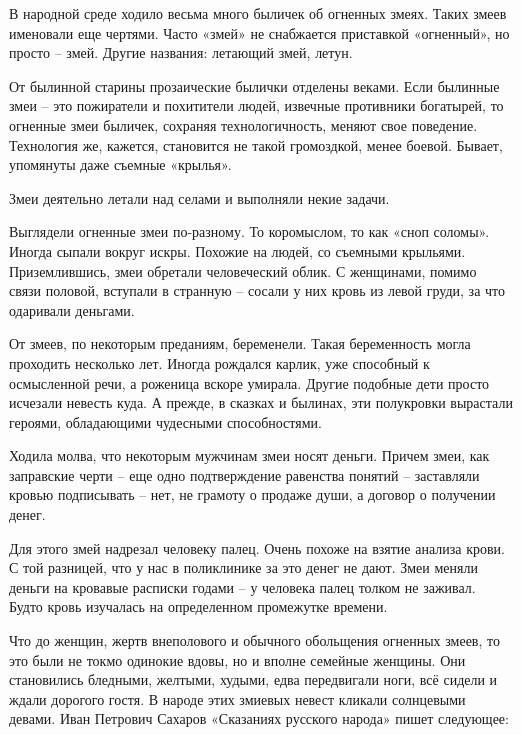 В народной среде ходило весьма много быличек об огненных змеях. Таких змеев именовали еще чертями. Часто «змей» не снабжается приставкой «огненный», но просто – змей. Другие названия: летающий змей, летун. 

От былинной старины прозаические былички отделены веками. Если былинные змеи – это пожиратели и похитители людей, извечные противники богатырей, то огненные змеи быличек, сохраняя технологичность, меняют свое поведение. Технология же, кажется, становится не такой громоздкой, менее боевой. Бывает, упомянуты даже съемные «крылья».

Змеи деятельно летали над селами и выполняли некие задачи.

Выглядели огненные змеи по-разному. То коромыслом, то как «сноп соломы». Иногда сыпали вокруг искры. Похожие на людей, со съемными крыльями. Приземлившись, змеи обретали человеческий облик. С женщинами, помимо связи половой, вступали в странную – сосали у них кровь из левой груди, за что одаривали деньгами. 

От змеев, по некоторым преданиям, беременели. Такая беременность могла проходить несколько лет. Иногда рождался карлик, уже способный к осмысленной речи, а роженица вскоре умирала. Другие подобные дети просто исчезали невесть куда. А прежде, в сказках и былинах, эти полукровки вырастали героями, обладающими чудесными способностями.

Ходила молва, что некоторым мужчинам змеи носят деньги. Причем змеи, как заправские черти – еще одно подтверждение равенства понятий – заставляли кровью подписывать – нет, не грамоту о продаже души, а договор о получении денег.

Для этого змей надрезал человеку палец. Очень похоже на взятие анализа крови. С той разницей, что у нас в поликлинике за это денег не дают. Змеи меняли деньги на кровавые расписки годами – у человека палец толком не заживал. Будто кровь изучалась на определенном промежутке времени.
 
Что до женщин, жертв внеполового и обычного обольщения огненных змеев, то это были не токмо одинокие вдовы, но и вполне семейные женщины. Они становились бледными, желтыми, худыми, едва передвигали ноги, всё сидели и ждали дорогого гостя. В народе этих змиевых невест кликали солнцевыми девами. Иван Петрович Сахаров «Сказаниях русского народа»\cite{saharov} пишет следующее:

